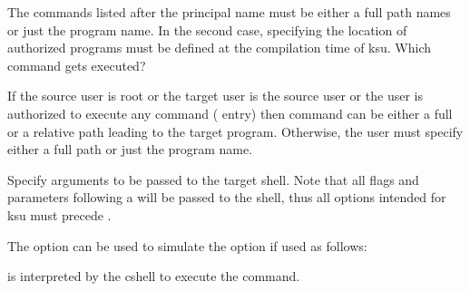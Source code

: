 \documentclass[letterpaper,10pt,english]{sphinxmanual}
\begin{document}
\begin{description}
\sphinxAtStartPar
The commands listed after the principal name must be either a full
path names or just the program name.  In the second case,
 specifying the location of authorized programs must
be defined at the compilation time of ksu.  Which command gets
executed?

\sphinxAtStartPar
If the source user is root or the target user is the source user
or the user is authorized to execute any command (\sphinxcode{\sphinxupquote{*}} entry)
then command can be either a full or a relative path leading to
the target program.  Otherwise, the user must specify either a
full path or just the program name.

\item[{\sphinxstylestrong{\sphinxhyphen{}a} \sphinxstyleemphasis{args}}] \leavevmode
\sphinxAtStartPar
Specify arguments to be passed to the target shell.  Note that all
flags and parameters following \sphinxhyphen{}a will be passed to the shell,
thus all options intended for ksu must precede .

\sphinxAtStartPar
The  option can be used to simulate the  option if
used as follows:

\begin{sphinxVerbatim}[commandchars=\\\{\}]
  \PYG{p}{[} \PYG{p}{[}\PYG{p}{]}\PYG{p}{]}
\end{sphinxVerbatim}

\sphinxAtStartPar
{} is interpreted by the c\sphinxhyphen{}shell to execute the command.

\end{description}
\end{document}
